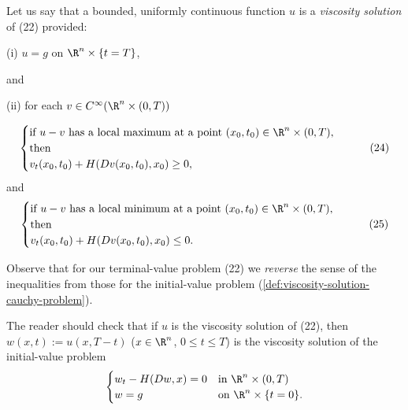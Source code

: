 \begin{definition}
\label{def:viscosity-solution-terminal-value-problem}
Let us say that a bounded, uniformly continuous function $u$ is a \textit{viscosity solution} of (22) provided:

(i) $u = g$ on $\R^n \times \{t = T\}$,

and

(ii) for each $v \in C^\infty(\R^n \times (0,T))$

\[
\begin{cases}
\text{if } u - v \text{ has a local maximum at a point } (x_0, t_0) \in \R^n \times (0,T), \\
\text{then} \\
v_t(x_0, t_0) + H(Dv(x_0, t_0), x_0) \geq 0,
\end{cases}
\tag{24}
\]
and
\[
\begin{cases}
\text{if } u - v \text{ has a local minimum at a point } (x_0, t_0) \in \R^n \times (0,T), \\
\text{then} \\
v_t(x_0, t_0) + H(Dv(x_0, t_0), x_0) \leq 0.
\end{cases}
\tag{25}
\]

Observe that for our terminal-value problem (22) we \textit{reverse} the sense of the inequalities from those for the initial-value problem (\cref{def:viscosity-solution-cauchy-problem}).
\end{definition}

\begin{remark}
\label{rem:terminal-value-time-reversal}
The reader should check that if $u$ is the viscosity solution of (22), then $w(x,t) := u(x, T - t)$ ($x \in \R^n$, $0 \leq t \leq T$) is the viscosity solution of the initial-value problem
\[
\begin{cases}
w_t - H(Dw, x) = 0 & \text{in } \R^n \times (0,T) \\
w = g & \text{on } \R^n \times \{t = 0\}.
\end{cases}
\]
\end{remark}

